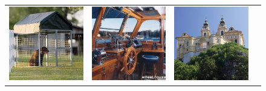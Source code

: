 \documentclass{beamer}
\begin{document}
\begin{frame}[plain]
\begin{figure}
{\begin{tabular}{cccc}
\includegraphics[width = 1.5in]{./images/sun397/kennel.jpg} &
\includegraphics[width = 1.5in]{./images/sun397/pilothouse.jpg} &
\includegraphics[width = 1.5in]{./images/sun397/abbey.jpg} \\
\end{tabular}
}
\end{figure}
\end{frame}
\end{document}
